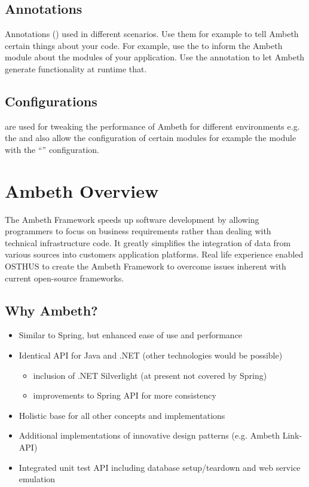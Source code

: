 \subsection{Annotations}
Annotations () used in different scenarios. Use them for example to tell Ambeth certain things about your code. For example, use the   to inform the Ambeth  module about the modules of your application. Use the  annotation to let Ambeth generate functionality at runtime that.

\subsection{Configurations}
 are used for tweaking the performance of Ambeth for different environments e.g. the  and also allow the configuration of certain modules for example the  module with the ``'' configuration.

\section{Ambeth Overview}
The Ambeth Framework speeds up software development by allowing programmers to focus on business requirements rather than dealing with technical infrastructure code. It greatly simplifies the integration of data from various sources into customers application platforms. Real life experience enabled OSTHUS\textsuperscript{\textregistered} to create the Ambeth Framework to overcome issues inherent with current open-source frameworks.


\subsection{Why Ambeth?}

\begin{itemize}
	\item Similar to Spring, but enhanced ease of use and performance
	\item Identical API for Java and .NET (other technologies would be possible)
	\begin{itemize}
		\item inclusion of .NET Silverlight (at present not covered by Spring)
		\item improvements to Spring API for more consistency
	\end{itemize}
	\item Holistic base for all other concepts and implementations
	\item Additional implementations of innovative design patterns (e.g. Ambeth Link-API)
	\item Integrated unit test API including database setup/teardown and web service emulation
\end{itemize}

